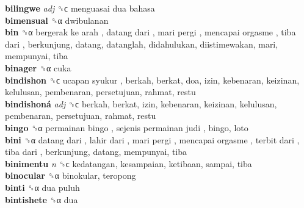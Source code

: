 \textbf{bilingwe} \emph{adj}  ␝ϲ   menguasai dua bahasa   \\
\textbf{bimensual} ␝α  dwibulanan  \\
\textbf{bin} ␝α   bergerak ke arah ,  datang dari ,  mari pergi ,  mencapai orgasme ,  tiba dari , berkunjung, datang, datanglah, didahulukan, diistimewakan, mari, mempunyai, tiba  \\
\textbf{binager} ␝α  cuka  \\
\textbf{bindishon} ␝ϲ   ucapan syukur , berkah, berkat, doa, izin, kebenaran, keizinan, kelulusan, pembenaran, persetujuan, rahmat, restu  \\
\textbf{bindishoná} \emph{adj}  ␝ϲ  berkah, berkat, izin, kebenaran, keizinan, kelulusan, pembenaran, persetujuan, rahmat, restu  \\
\textbf{bingo} ␝α   permainan bingo ,  sejenis permainan judi , bingo, loto  \\
\textbf{bini} ␝α   datang dari ,  lahir dari ,  mari pergi ,  mencapai orgasme ,  terbit dari ,  tiba dari , berkunjung, datang, mempunyai, tiba  \\
\textbf{binimentu} \emph{n}  ␝ϲ  kedatangan, kesampaian, ketibaan, sampai, tiba  \\
\textbf{binocular} ␝α  binokular, teropong  \\
\textbf{binti} ␝α   dua puluh   \\
\textbf{bintishete} ␝α  dua  \\
